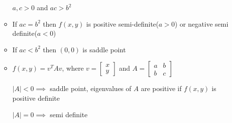 \documentclass[a4paper]{article}
\begin{document}
\begin{enumerate}
\begin{itemize}
			$a,c > 0$ and $ac > b^{2}$
			\item If $ac = b^{2}$ then $f(x,y)$ is positive semi-definite($a>0$) or negative semi definite($a<0$)
			\item If $ac < b^{2}$ then $(0,0)$ is saddle point
			\item $f(x,y) = v^{T}Av$, where $v = \begin{bmatrix}x\\
			y\end{bmatrix}$ and $A = \begin{bmatrix}a&b\\
			b&c\end{bmatrix}$
			
			$|A| < 0\implies$ saddle point, eigenvalues of $A$ are positive if $f(x,y)$ is positive definite
			
			$|A| = 0\implies$ semi definite
		\end{itemize}
	\end{enumerate}
\end{document}

